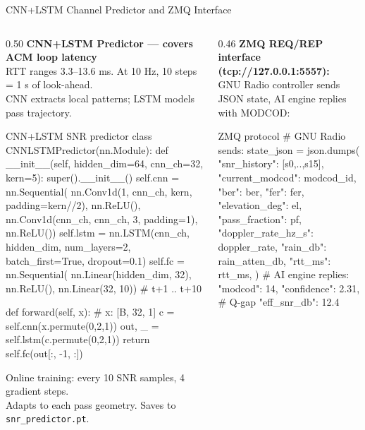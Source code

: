 \documentclass[aspectratio=169,10pt]{beamer}
\begin{document}
\begin{frame}[fragile,shrink=10]{CNN+LSTM Channel Predictor and ZMQ Interface}
  \begin{columns}[T]
    \begin{column}{0.50\textwidth}
      \textbf{CNN+LSTM Predictor — covers ACM loop latency}\\
      \scriptsize RTT ranges 3.3--13.6 ms. At 10 Hz, 10 steps = 1 s of look-ahead.\\
      CNN extracts local patterns; LSTM models pass trajectory.

\begin{codeblock}{CNN+LSTM SNR predictor}
class CNNLSTMPredictor(nn.Module):
  def __init__(self, hidden_dim=64,
               cnn_ch=32, kern=5):
    super().__init__()
    self.cnn = nn.Sequential(
      nn.Conv1d(1, cnn_ch, kern,
                padding=kern//2), nn.ReLU(),
      nn.Conv1d(cnn_ch, cnn_ch, 3,
                padding=1), nn.ReLU())
    self.lstm = nn.LSTM(cnn_ch, hidden_dim,
                        num_layers=2,
                        batch_first=True,
                        dropout=0.1)
    self.fc = nn.Sequential(
      nn.Linear(hidden_dim, 32), nn.ReLU(),
      nn.Linear(32, 10))  # t+1 .. t+10

  def forward(self, x):  # x: [B, 32, 1]
    c = self.cnn(x.permute(0,2,1))
    out, _ = self.lstm(c.permute(0,2,1))
    return self.fc(out[:, -1, :])
\end{codeblock}

      Online training: every 10 SNR samples, 4 gradient steps.\\
      Adapts to each pass geometry. Saves to \texttt{snr\_predictor.pt}.
    \end{column}
    \begin{column}{0.46\textwidth}
      \textbf{ZMQ REQ/REP interface (tcp://127.0.0.1:5557):}\\
      \scriptsize GNU Radio controller sends JSON state, AI engine replies with MODCOD:

\begin{codeblock}{ZMQ protocol}
# GNU Radio sends:
state_json = json.dumps({
  "snr_history": [s0,..,s15],
  "current_modcod": modcod_id,
  "ber": ber, "fer": fer,
  "elevation_deg": el,
  "pass_fraction": pf,
  "doppler_rate_hz_s": doppler_rate,
  "rain_db": rain_atten_db,
  "rtt_ms": rtt_ms,
})
# AI engine replies:
{"modcod": 14,
 "confidence": 2.31,  # Q-gap
 "eff_snr_db": 12.4}
\end{codeblock}


\end{column}
\end{columns}
\end{frame}
\end{document}
